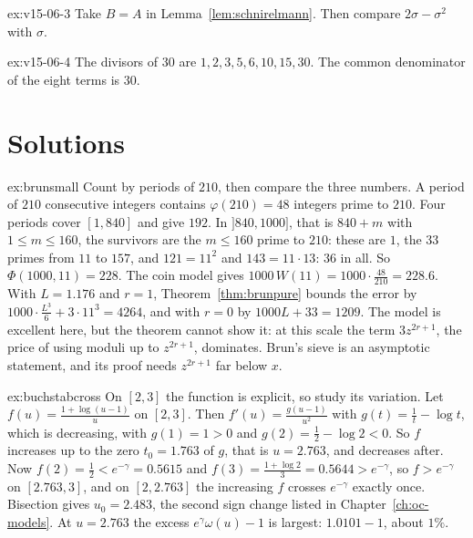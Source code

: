 \begin{hint}{ex:v15-06-3}
Take \(B=A\) in Lemma~\ref{lem:schnirelmann}. Then compare \(2\sigma-\sigma^2\) with \(\sigma\).
\end{hint}

\begin{hint}{ex:v15-06-4}
The divisors of \(30\) are \(1,2,3,5,6,10,15,30\). The common denominator of the eight terms is \(30\).
\end{hint}

\section{Solutions}

\begin{solution}{ex:brunsmall}
\idea Count by periods of $210$, then compare the three numbers.
\writeup A period of $210$ consecutive integers contains $\varphi(210)=48$ integers prime to $210$. Four periods cover $[1,840]$ and give $192$. In $]840,1000]$, that is $840+m$ with $1\le m\le160$, the survivors are the $m\le160$ prime to $210$: these are $1$, the $33$ primes from $11$ to $157$, and $121=11^2$ and $143=11\cdot13$: $36$ in all. So $\Phi(1000,11)=228$. The coin model gives $1000\,W(11)=1000\cdot\frac{48}{210}=228.6$. With $L=1.176$ and $r=1$, Theorem~\ref{thm:brunpure} bounds the error by $1000\cdot\frac{L^3}6+3\cdot11^3=4264$, and with $r=0$ by $1000L+33=1209$. The model is excellent here, but the theorem cannot show it: at this scale the term $3z^{2r+1}$, the price of using moduli up to $z^{2r+1}$, dominates. Brun's sieve is an asymptotic statement, and its proof needs $z^{2r+1}$ far below $x$.
\end{solution}

\begin{solution}{ex:buchstabcross}
\idea On $[2,3]$ the function is explicit, so study its variation.
\writeup Let $f(u)=\frac{1+\log(u-1)}u$ on $[2,3]$. Then $f'(u)=\frac{g(u-1)}{u^2}$ with $g(t)=\frac1t-\log t$, which is decreasing, with $g(1)=1>0$ and $g(2)=\frac12-\log2<0$. So $f$ increases up to the zero $t_0=1.763$ of $g$, that is $u=2.763$, and decreases after. Now $f(2)=\frac12<e^{-\gamma}=0.5615$ and $f(3)=\frac{1+\log2}3=0.5644>e^{-\gamma}$, so $f>e^{-\gamma}$ on $[2.763,3]$, and on $[2,2.763]$ the increasing $f$ crosses $e^{-\gamma}$ exactly once. Bisection gives $u_0=2.483$, the second sign change listed in Chapter~\ref{ch:oc-models}. At $u=2.763$ the excess $e^\gamma\omega(u)-1$ is largest: $1.0101-1$, about $1\%$.
\end{solution}

